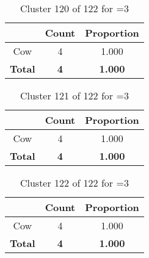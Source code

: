 \clearpage
\begin{table}[ht!]
\centering
\begin{tabular}{|c|c|c|}
\hline
\bf \Spec{} &\bf Count &\bf Proportion\\ \hline \hline
Cow & 4 & 1.000\\ \hline
\hline
\bf Total & \bf 4 & \bf 1.000\\ \hline
\end{tabular}
\label{tab:cluster:120:3}
\caption{Cluster 120 of 122 for \minneigh{}=3}
\end{table}

\begin{table}[ht!]
\centering
\begin{tabular}{|c|c|c|}
\hline
\bf \Spec{} &\bf Count &\bf Proportion\\ \hline \hline
Cow & 4 & 1.000\\ \hline
\hline
\bf Total & \bf 4 & \bf 1.000\\ \hline
\end{tabular}
\label{tab:cluster:121:3}
\caption{Cluster 121 of 122 for \minneigh{}=3}
\end{table}

\begin{table}[ht!]
\centering
\begin{tabular}{|c|c|c|}
\hline
\bf \Spec{} &\bf Count &\bf Proportion\\ \hline \hline
Cow & 4 & 1.000\\ \hline
\hline
\bf Total & \bf 4 & \bf 1.000\\ \hline
\end{tabular}
\label{tab:cluster:122:3}
\caption{Cluster 122 of 122 for \minneigh{}=3}
\end{table}

